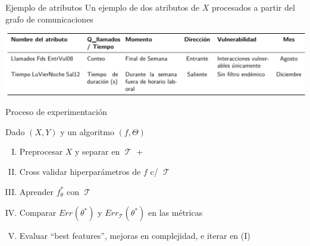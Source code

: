 \documentclass[xcolor=x11names]{beamer}
\DeclareMathOperator{\trainset}{\mathcal{T}}
\DeclareMathOperator{\testset}{\mathcal{T_s}}
\begin{document}
\begin{frame}{Ejemplo de atributos}
Un ejemplo de dos atributos de $X$ procesados a partir del grafo de comunicaciones
  \begin{center}
    \includegraphics[scale=0.65]{slides/tabla_atributos.pdf}
  \end{center}
\end{frame}



\begin{frame}{ Proceso de experimentación }

Dado $(X,Y)$ y un algoritmo $\left( f, \Theta \right)  $
	\begin{enumerate}[I.]
		\item Preprocesar $X$ y separar en $\trainset$ + $\testset$
		\item Cross validar hiperparámetros de $f$ c/ $\trainset$
		\item Aprender $f_\theta^*$ con $\trainset$
		\item Comparar  $Err_{\testset}(\theta^*)$ y  $Err_{\trainset}(\theta^*)$ en las métricas
		\item Evaluar ``best features'', mejoras en complejidad, e iterar en (I)
	\end{enumerate}

\end{frame}
\end{document}
